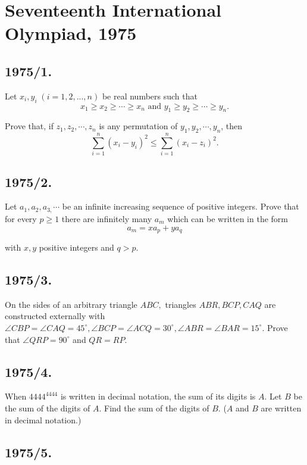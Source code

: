 \documentclass[12pt,thmsa]{article}
\begin{document}
\section{Seventeenth International Olympiad, 1975}

\subsection{1975/1.}

Let $x_{i},y_{i}\;(i=1,2,...,n)$ be real numbers such that
\[
x_{1}\geq x_{2}\geq \cdots \geq x_{n}\text{ and }y_{1}\geq y_{2}\geq \cdots
\geq y_{n}.
\]

Prove that, if $z_{1},z_{2},\cdots ,z_{n}$ is any permutation of $%
y_{1},y_{2},\cdots ,y_{n}$, then
\[
\sum_{i=1}^{n}(x_{i}-y_{i})^{2}\leq \sum_{i=1}^{n}(x_{i}-z_{i})^{2}.
\]

\subsection{1975/2. }

Let $a_{1},a_{2},a_{3,}\cdots $ be an infinite increasing sequence of
positive integers. Prove that for every $p\geq 1$ there are infinitely many $%
a_{m}$ which can be written in the form
\[
a_{m}=xa_{p}+ya_{q}
\]

with $x,y$ positive integers and $q>p.$

\subsection{1975/3. }

On the sides of an arbitrary triangle $ABC,$ triangles $ABR,BCP,CAQ$ are
constructed externally with $\angle CBP=\angle CAQ=45^{\circ },\angle
BCP=\angle ACQ=30^{\circ },\angle ABR=\angle BAR=15^{\circ }.$ Prove that $%
\angle QRP=90^{\circ }$ and $QR=RP.$

\subsection{1975/4. }

When $4444^{4444}$ is written in decimal notation, the sum of its digits is $%
A.$ Let $B$ be the sum of the digits of $A.$ Find the sum of the digits of $%
B.$ ($A$ and $B$ are written in decimal notation.)

\subsection{1975/5. }
\end{document}
